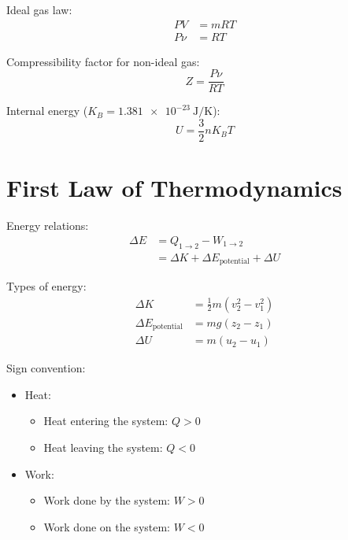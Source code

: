 \documentclass[10pt, twocolumn]{article}
\begin{document}
Ideal gas law:
\begin{align*}
  PV   & = mRT \\
  P\nu & = RT
\end{align*}

Compressibility factor for non-ideal gas:
\[
  Z = \frac{P\nu}{RT}
\]

Internal energy (\(K_B = \SI{1.381 e-23}{\joule\per\kelvin}\)):
\[
  U = \frac{3}{2}nK_B T
\]

\section{First Law of Thermodynamics}
Energy relations:
\begin{align*}
  \Delta E & = Q_{1 \rightarrow 2} - W_{1 \rightarrow 2}           \\
           & = \Delta K + \Delta E_{\mathrm{potential}} + \Delta U
\end{align*}

Types of energy:
\begin{align*}
  \Delta K                      & = \frac{1}{2}m\left( v_2 ^2 - v_1 ^2 \right) \\
  \Delta E_{\mathrm{potential}} & = mg\left( z_2 - z_1 \right)               \\
  \Delta U                      & = m\left( u_2 - u_1 \right)
\end{align*}

Sign convention:
\begin{itemize}
  \item Heat:
        \begin{itemize}
          \item Heat entering the system: \(Q > 0\)
          \item Heat leaving the system: \(Q < 0\)
        \end{itemize}
  \item Work:
        \begin{itemize}
          \item Work done by the system: \(W > 0\)
          \item Work done on the system: \(W < 0\)
        \end{itemize}
\end{itemize}
\end{document}
